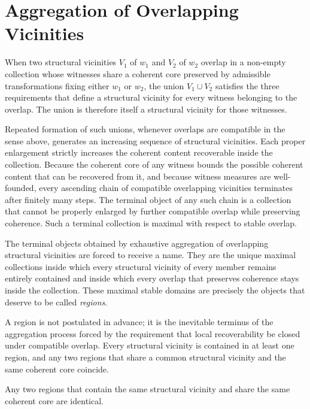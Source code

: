 \documentclass[12pt,anyside]{book}
\newcommand{\term}[1]{\textit{#1}}             %
\begin{document}
\section{Aggregation of Overlapping Vicinities}
When two structural vicinities $V_1$ of $w_1$ and $V_2$ of $w_2$ overlap in a non-empty collection whose witnesses share a coherent core preserved by admissible transformations fixing either $w_1$ or $w_2$, the union $V_1 \cup V_2$ satisfies the three requirements that define a structural vicinity for every witness belonging to the overlap. The union is therefore itself a structural vicinity for those witnesses.

Repeated formation of such unions, whenever overlaps are compatible in the sense above, generates an increasing sequence of structural vicinities. Each proper enlargement strictly increases the coherent content recoverable inside the collection. Because the coherent core of any witness bounds the possible coherent content that can be recovered from it, and because witness measures are well-founded, every ascending chain of compatible overlapping vicinities terminates after finitely many steps. The terminal object of any such chain is a collection that cannot be properly enlarged by further compatible overlap while preserving coherence. Such a terminal collection is maximal with respect to stable overlap.

The terminal objects obtained by exhaustive aggregation of overlapping structural vicinities are forced to receive a name. They are the unique maximal collections inside which every structural vicinity of every member remains entirely contained and inside which every overlap that preserves coherence stays inside the collection. These maximal stable domains are precisely the objects that deserve to be called \term{regions}. 

A region is not postulated in advance; it is the inevitable terminus of the aggregation process forced by the requirement that local recoverability be closed under compatible overlap. Every structural vicinity is contained in at least one region, and any two regions that share a common structural vicinity and the same coherent core coincide.

\begin{theorem}
Any two regions that contain the same structural vicinity and share the same coherent core are identical.
\end{theorem}
\end{document}
